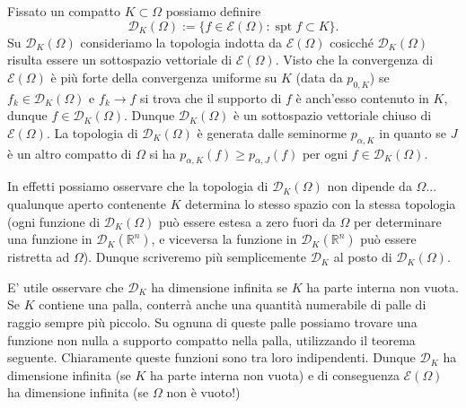 \documentclass[italian,a4paper,oneside,headinclude]{scrbook}
\newcommand{\D}{\mathcal D}
\newcommand{\E}{\mathcal E}
\newcommand{\RR}{\mathbb R}
\newcommand{\defeq}{:=}
\DeclareMathOperator{\spt}{spt}
\begin{document}
Fissato un compatto $K\subset \Omega$ possiamo definire
\[
\D_K(\Omega) \defeq \{ f\in \E(\Omega)\colon \spt f \subset K\}.
\]
Su $\D_K(\Omega)$ consideriamo la topologia indotta da
$\E(\Omega)$ cosicché $\D_K(\Omega)$ risulta essere un
sottospazio vettoriale di $\E(\Omega)$. Visto che la
convergenza di $\E(\Omega)$ è più forte della convergenza
uniforme su $K$ (data da $p_{0,K}$) se $f_k\in \D_K(\Omega)$ e
$f_k\to f$ si trova che il
supporto di $f$ è anch'esso contenuto in $K$, dunque
$f\in \D_K(\Omega)$.
Dunque $\D_K(\Omega)$ è un sottospazio vettoriale
chiuso di $\E(\Omega)$. La topologia di $\D_K(\Omega)$ è
generata dalle seminorme $p_{\alpha,K}$ in quanto se $J$ è un altro
compatto di $\Omega$ si ha $p_{\alpha,K}(f)\ge p_{\alpha,J}(f)$ per
ogni $f\in \D_K(\Omega)$.

In effetti possiamo osservare che la topologia di $\D_K(\Omega)$ non
dipende da $\Omega$... qualunque aperto contenente $K$ determina lo
stesso spazio con la stessa topologia (ogni funzione di $\D_K(\Omega)$
può essere estesa a zero fuori da $\Omega$ per determinare una
funzione in $\D_K(\RR^n)$, e viceversa la funzione in $\D_K(\RR^n)$
può essere ristretta ad $\Omega$). Dunque scriveremo più semplicemente
$\D_K$ al posto di $\D_K(\Omega)$.

E' utile osservare che $\D_K$ ha dimensione infinita se $K$ ha parte
interna non vuota. Se $K$ contiene una palla, conterrà anche una
quantità numerabile di palle di raggio sempre più piccolo. Su ognuna
di queste palle possiamo trovare una funzione non nulla a supporto
compatto nella palla, utilizzando il teorema seguente.
Chiaramente queste funzioni sono tra loro
indipendenti. Dunque $\D_K$ ha dimensione infinita (se $K$ ha parte
interna non vuota) e di conseguenza $\E(\Omega)$ ha dimensione
infinita (se $\Omega$ non è vuoto!)
\end{document}
